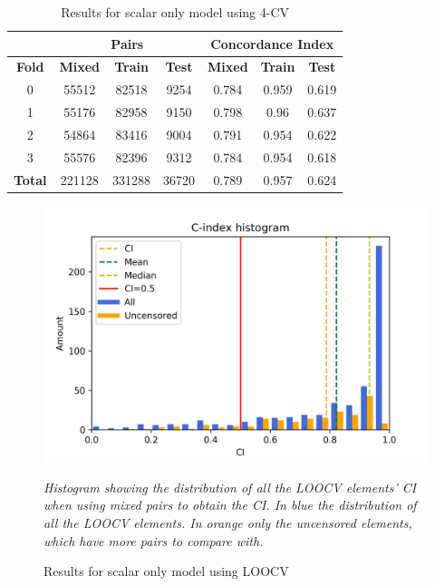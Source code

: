 \begin{table}
  \centering
  \begin{tabular}{|c||c|c|c||c|c|c|}
    \cline{2-7}
    \multicolumn{1}{c|}{} & \multicolumn{3}{|c||}{\textbf{Pairs}} & 
    \multicolumn{3}{c|}{\textbf{Concordance Index}} \\
    \hline
    \textbf{Fold} & \textbf{Mixed} & \textbf{Train} & \textbf{Test} & 
    \textbf{Mixed} & \textbf{Train} & \textbf{Test} \\
    \hhline{=======}
    0 & 55512 & 82518 & 9254 & 0.784 & 0.959 & 0.619 \\
    1 & 55176 & 82958 & 9150 & 0.798 & 0.96 & 0.637 \\
    2 & 54864 & 83416 & 9004 & 0.791 & 0.954 & 0.622 \\
    3 & 55576 & 82396 & 9312 & 0.784 & 0.954 & 0.618 \\
    \hhline{=======}
    \textbf{Total} & 221128 & 331288 & 36720 & 0.789 & 0.957 & 0.624\\
    \hline
  \end{tabular}

  \caption{Results for scalar only model using 4-CV \label{tab:results-scalar-4CV}}
\end{table}

\begin{figure}
  \centering
  \includegraphics[width=.8\textwidth]{images/results/c-index_scalar}
  \caption{Results for scalar only model using \gls{LOOCV} \label{fig:results-scalar-LOOCV}}

  \itshape\justify
  Histogram showing the distribution of all the \acrshort{LOOCV} elements' \acrshort{CI}
  when using mixed pairs to obtain the \acrshort{CI}. 
  In blue the distribution of all the \acrshort{LOOCV} elements. In orange only the uncensored
  elements, which have more pairs to compare with.
\end{figure}


